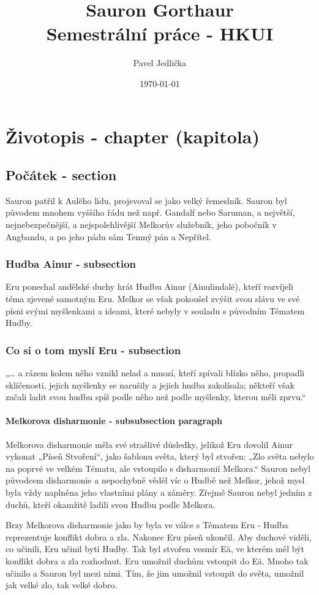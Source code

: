 \documentclass[12pt]{report}
\title{Sauron Gorthaur \\ Semestrální práce - HKUI}
\author{Pavel Jedlička}
\date{\today}
\begin{document}
\thispagestyle{empty}
\maketitle
\tableofcontents

\chapter{Životopis - chapter (kapitola)}
\section{Počátek - section}
Sauron patřil k Aulëho lidu, projevoval se jako velký řemeslník. Sauron byl původem mnohem vyššího řádu než např. Gandalf nebo Saruman, a největší, nejnebezpečnější, a nejspolehlivější Melkorův služebník, jeho pobočník v Angbandu, a po jeho pádu sám Temný pán a Nepřítel.
\subsection{Hudba Ainur - subsection}
Eru ponechal andělské duchy hrát Hudbu Ainur (Ainulindalë), kteří rozvíjeli téma zjevené samotným Eru. Melkor se však pokoušel zvýšit svou slávu ve své písni svými myšlenkami a ideami, které nebyly v souladu s původním Tématem Hudby. 
\subsection{Co si o tom myslí Eru - subsection}
„… a rázem kolem něho vznikl nelad a mnozí, kteří zpívali blízko něho, propadli sklíčenosti, jejich myšlenky se narušily a jejich hudba zakolísala; někteří však začali ladit svou hudbu spíš podle něho než podle myšlenky, kterou měli zprvu.“
\subsubsection{Melkorova disharmonie - subsubsection \texttilde paragraph}
Melkorova disharmonie měla své strašlivé důsledky, jelikož Eru dovolil Ainur vykonat „Píseň Stvoření“, jako šablonu světa, který byl stvořen: „Zlo světa nebylo na poprvé ve velkém Tématu, ale vstoupilo s disharmonií Melkora.“ Sauron nebyl původcem disharmonie a nepochybně věděl víc o Hudbě než Melkor, jehož mysl byla vždy naplněna jeho vlastními plány a záměry. Zřejmě Sauron nebyl jedním z duchů, kteří okamžitě ladili svou Hudbu podle Melkora.

Brzy Melkorova disharmonie jako by byla ve válce s Tématem Eru - Hudba reprezentuje konflikt dobra a zla. Nakonec Eru píseň ukončil. Aby duchové viděli, co učinili, Eru učinil bytí Hudby. Tak byl stvořen vesmír Eä, ve kterém měl být konflikt dobra a zla rozhodnut. Eru umožnil duchům vstoupit do Eä. Mnoho tak učinilo a Sauron byl mezi nimi. Tím, že jim umožnil vstoupit do světa, umožnil jak velké zlo, tak velké dobro. 
\end{document}

